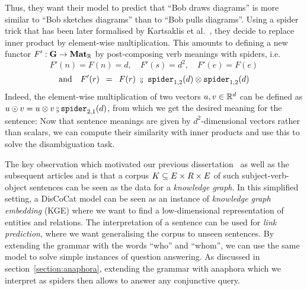 Thus, they want their model to predict that ``Bob draws diagrams'' is more similar to ``Bob sketches diagrams'' than to ``Bob pulls diagrams''.
Using a spider trick that has been later formalised by Kartsaklis et al.~\cite{KartsaklisEtAl12}, they decide to replace inner product by element-wise multiplication.
This amounts to defining a new functor $F' : \mathbf{G} \to \mathbf{Mat}_{\mathbb{R}}$ by post-composing verb meanings with spiders, i.e.
$$
F'(n) = F(n) = d, \quad F'(s) = d^2, \quad F'(e) = F(e)
$$ $$
\text{and} \quad F'(r) \s = \s F(r) \ \fcmp \ \spider_{1, 2}(d) \otimes \spider_{1, 2}(d)
$$
Indeed, the element-wise multiplication of two vectors $u, v \in \mathbb{R}^d$ can be defined as $u \odot v = u \otimes v \fcmp \spider_{2, 1}(d)$, from which we get the desired meaning for the sentence:
Now that sentence meanings are given by $d^2$-dimensional vectors rather than scalars, we can compute their similarity with inner products and use this to solve the disambiguation task.

The key observation which motivated our previous dissertation~\cite{Toumi18a} as well as the subsequent articles \cite{CoeckeEtAl18a} and \cite{FeliceEtAl19} is that a corpus $K \subseteq E \times R \times E$ of such subject-verb-object sentences can be seen as the data for a \emph{knowledge graph}.
In this simplified setting, a DisCoCat model can be seen as an instance of \emph{knowledge graph embedding} (KGE) where we want to find a low-dimensional representation of entities and relations.
The interpretation of a sentence can be used for \emph{link prediction}, where we want generalising the corpus to unseen sentences.
By extending the grammar with the words ``who'' and ``whom'', we can use the same model to solve simple instances of question answering.
As discussed in section~\ref{section:anaphora}, extending the grammar with anaphora which we interpret as spiders then allows to answer any conjunctive query.

